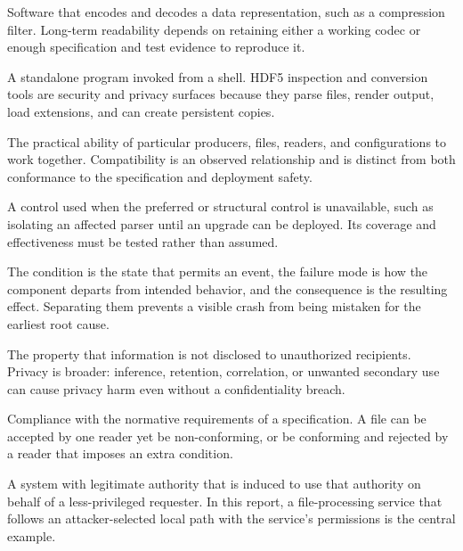 \documentclass[../main.tex]{subfiles}
\begin{document}
\begin{description}[leftmargin=1.5em,style=nextline]
\item[Codec.]
Software that encodes and decodes a data representation, such as a compression
filter. Long-term readability depends on retaining either a working codec or
enough specification and test evidence to reproduce it.

\item[Command-line tool.]
A standalone program invoked from a shell. HDF5 inspection and conversion tools
are security and privacy surfaces because they parse files, render output, load
extensions, and can create persistent copies.

\item[Compatibility.]
The practical ability of particular producers, files, readers, and
configurations to work together. Compatibility is an observed relationship and
is distinct from both conformance to the specification and deployment safety.

\item[Compensating control.]
A control used when the preferred or structural control is unavailable, such
as isolating an affected parser until an upgrade can be deployed. Its coverage
and effectiveness must be tested rather than assumed.

\item[Condition / failure mode / consequence.]
The condition is the state that permits an event, the failure mode is how the
component departs from intended behavior, and the consequence is the resulting
effect. Separating them prevents a visible crash from being mistaken for the
earliest root cause.

\item[Confidentiality.]
The property that information is not disclosed to unauthorized recipients.
Privacy is broader: inference, retention, correlation, or unwanted secondary
use can cause privacy harm even without a confidentiality breach.

\item[Conformance.]
Compliance with the normative requirements of a specification. A file can be
accepted by one reader yet be non-conforming, or be conforming and rejected by
a reader that imposes an extra condition.

\item[Confused deputy.]
A system with legitimate authority that is induced to use that authority on
behalf of a less-privileged requester. In this report, a file-processing service
that follows an attacker-selected local path with the service's permissions is
the central example.


\end{description}
\end{document}
